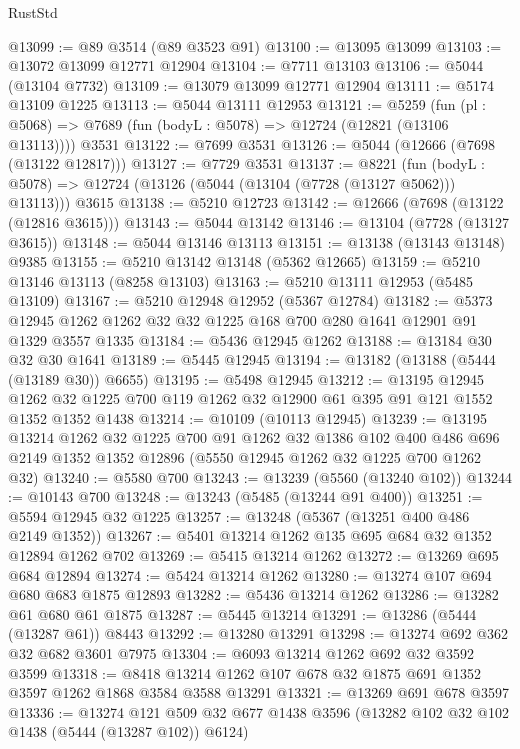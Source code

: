 \begin{lexlean}{RustStd}
\begin{coremodule}
@13099 := @89 @3514 (@89 @3523 @91)
@13100 := @13095 @13099
@13103 := @13072 @13099 @12771 @12904
@13104 := @7711 @13103
@13106 := @5044 (@13104 @7732)
@13109 := @13079 @13099 @12771 @12904
@13111 := @5174 @13109 @1225
@13113 := @5044 @13111 @12953
@13121 := @5259
    (fun (pl : @5068) => @7689 (fun (bodyL : @5078) => @12724 (@12821 (@13106 @13113))))
    @3531
@13122 := @7699 @3531
@13126 := @5044 (@12666 (@7698 (@13122 @12817)))
@13127 := @7729 @3531
@13137 := @8221
    (fun (bodyL : @5078) => @12724 (@13126 (@5044 (@13104 (@7728 (@13127 @5062))) @13113)))
    @3615
@13138 := @5210 @12723
@13142 := @12666 (@7698 (@13122 (@12816 @3615)))
@13143 := @5044 @13142
@13146 := @13104 (@7728 (@13127 @3615))
@13148 := @5044 @13146 @13113
@13151 := @13138 (@13143 @13148) @9385
@13155 := @5210 @13142 @13148 (@5362 @12665)
@13159 := @5210 @13146 @13113 (@8258 @13103)
@13163 := @5210 @13111 @12953 (@5485 @13109)
@13167 := @5210 @12948 @12952 (@5367 @12784)
@13182 := @5373 @12945 @1262 @1262 @32 @32 @1225 @168 @700 @280 @1641 @12901 @91 @1329 @3557 @1335
@13184 := @5436 @12945 @1262
@13188 := @13184 @30 @32 @30 @1641
@13189 := @5445 @12945
@13194 := @13182 (@13188 (@5444 (@13189 @30)) @6655)
@13195 := @5498 @12945
@13212 := @13195
    @12945
    @1262
    @32
    @1225
    @700
    @119
    @1262
    @32
    @12900
    @61
    @395
    @91
    @121
    @1552
    @1352
    @1352
    @1438
@13214 := @10109 (@10113 @12945)
@13239 := @13195
    @13214
    @1262
    @32
    @1225
    @700
    @91
    @1262
    @32
    @1386
    @102
    @400
    @486
    @696
    @2149
    @1352
    @1352
    @12896
    (@5550 @12945 @1262 @32 @1225 @700 @1262 @32)
@13240 := @5580 @700
@13243 := @13239 (@5560 (@13240 @102))
@13244 := @10143 @700
@13248 := @13243 (@5485 (@13244 @91 @400))
@13251 := @5594 @12945 @32 @1225
@13257 := @13248 (@5367 (@13251 @400 @486 @2149 @1352))
@13267 := @5401 @13214 @1262 @135 @695 @684 @32 @1352 @12894 @1262 @702
@13269 := @5415 @13214 @1262
@13272 := @13269 @695 @684 @12894
@13274 := @5424 @13214 @1262
@13280 := @13274 @107 @694 @680 @683 @1875 @12893
@13282 := @5436 @13214 @1262
@13286 := @13282 @61 @680 @61 @1875
@13287 := @5445 @13214
@13291 := @13286 (@5444 (@13287 @61)) @8443
@13292 := @13280 @13291
@13298 := @13274 @692 @362 @32 @682 @3601 @7975
@13304 := @6093 @13214 @1262 @692 @32 @3592 @3599
@13318 := @8418 @13214 @1262 @107 @678 @32 @1875 @691 @1352 @3597 @1262 @1868 @3584 @3588 @13291
@13321 := @13269 @691 @678 @3597
@13336 := @13274
    @121
    @509
    @32
    @677
    @1438
    @3596
    (@13282 @102 @32 @102 @1438 (@5444 (@13287 @102)) @6124)

\end{coremodule}
\end{lexlean}
